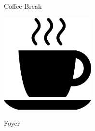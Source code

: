 \documentclass[a4paper]{article}
\begin{document}
\printGenericVSLHeader
\begin{center}
    \vspace{-2cm}
\begin{vsltext}{3cm}{4cm}
    Coffee Break

    \vspace{0.5cm}

    \includegraphics[height=5cm, keepaspectratio=true]{coffeecup.png}

    \vspace{0.5cm}

    Foyer

\end{vsltext}

\end{center}
\end{document}

